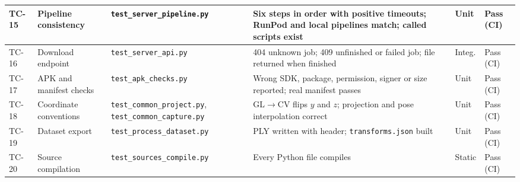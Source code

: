 {\begin{longtable}{p{}p{}p{}p{}p{}p{}}
TC-15 & Pipeline consistency & \texttt{test\_server\_pipeline.py} & Six steps in order with positive timeouts; RunPod and local pipelines match; called scripts exist & Unit & Pass (CI) \\
\midrule
TC-16 & Download endpoint & \texttt{test\_server\_api.py} & 404 unknown job; 409 unfinished or failed job; file returned when finished & Integ. & Pass (CI) \\
\midrule
TC-17 & APK and manifest checks & \texttt{test\_apk\_checks.py} & Wrong SDK, package, permission, signer or size reported; real manifest passes & Unit & Pass (CI) \\
\midrule
TC-18 & Coordinate conventions & \texttt{test\_common\_project.py}, \texttt{test\_common\_capture.py} & GL$\rightarrow$CV flips $y$ and $z$; projection and pose interpolation correct & Unit & Pass (CI) \\
\midrule
TC-19 & Dataset export & \texttt{test\_process\_dataset.py} & PLY written with header; \texttt{transforms.json} built & Unit & Pass (CI) \\
\midrule
TC-20 & Source compilation & \texttt{test\_sources\_compile.py} & Every Python file compiles & Static & Pass (CI) \\
\bottomrule
\end{longtable}
}
